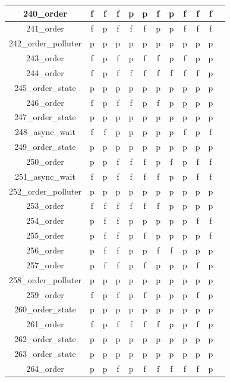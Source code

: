 \documentclass[
fancyheadings, %
%
%
]{stsreprt}
\begin{document}
\begin{longtable}{|c|c|c|c|c|c|c|c|c|c|c|c|}
\hline
240\_order & f & f & f & p & p & f & p & f & f & f \\
\hline
241\_order & f & p & f & f & f & p & p & f & f & f \\
\hline
242\_order\_polluter & p & p & p & p & p & p & p & p & p & p \\
\hline
243\_order & f & p & f & p & f & f & p & f & p & p \\
\hline
244\_order & f & p & f & f & f & f & f & f & f & p \\
\hline
245\_order\_state & p & p & p & p & p & p & p & p & p & p \\
\hline
246\_order & f & p & f & f & p & f & p & p & p & p \\
\hline
247\_order\_state & p & p & p & p & p & p & p & p & p & p \\
\hline
248\_async\_wait & f & f & p & p & p & p & p & f & p & f \\
\hline
249\_order\_state & p & p & p & p & p & p & p & p & p & p \\
\hline
250\_order & p & p & f & f & f & p & f & p & f & f \\
\hline
251\_async\_wait & f & p & f & f & f & f & p & p & f & f \\
\hline
252\_order\_polluter & p & p & p & p & p & p & p & p & p & p \\
\hline
253\_order & f & f & f & f & f & f & p & p & p & p \\
\hline
254\_order & p & f & f & p & p & p & p & p & f & f \\
\hline
255\_order & p & f & f & p & f & p & p & p & p & f \\
\hline
256\_order & p & f & f & p & p & f & f & p & p & p \\
\hline
257\_order & p & f & f & p & f & p & p & p & f & p \\
\hline
258\_order\_polluter & p & p & p & p & p & p & p & p & p & p \\
\hline
259\_order & f & p & f & p & f & p & p & p & f & p \\
\hline
260\_order\_state & p & p & p & p & p & p & p & p & p & p \\
\hline
261\_order & f & p & f & f & f & f & p & p & f & p \\
\hline
262\_order\_state & p & p & p & p & p & p & p & p & p & p \\
\hline
263\_order\_state & p & p & p & p & p & p & p & p & p & p \\
\hline
264\_order & p & p & f & p & f & f & f & f & f & p \\

\end{longtable}
\end{document}

